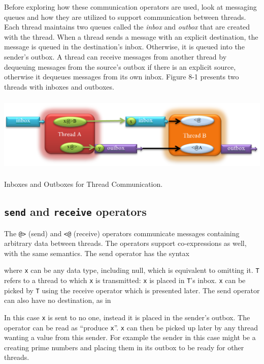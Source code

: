 Before exploring how these communication operators are used, look
at messaging queues and how they are utilized to support communication between
threads.  Each thread maintains two queues called the \emph{inbox} and
\emph{outbox} that are created with the thread.  When a thread sends a message
with an explicit destination, the message is queued in the destination's
inbox. Otherwise, it is queued into the sender's outbox.  A thread can receive
messages from another thread by dequeuing messages from the source's outbox if
there is an explicit source, otherwise it dequeues messages from its own inbox.
Figure 8-1 presents two threads with inboxes and outboxes.
\begin{center}
  \includegraphics[width=5.75in,height=1.45in]{ub-img/thread-fig1.png}
\end{center}
\vspace{-0.25cm}{\sffamily\bfseries Figure 8-1:}
{\sffamily Inboxes and Outboxes for Thread Communication.}


\subsection{\texttt{send} and \texttt{receive} operators}

The \texttt{@>} (send) and \texttt{{<}@} (receive) operators communicate
messages containing arbitrary data between threads. The operators support
co-expressions as well, with the same semantics. The send operator has the
syntax


\noindent
where \texttt{x} can be any data type, including null, which is equivalent to omitting
it. \texttt{T} refers to a thread to which \texttt{x} is transmitted: \texttt{x}
is placed in \texttt{T}'s inbox.  \texttt{x} can be picked by \texttt{T} using
the receive operator which is presented later. The send operator can also have
no destination, as in


In this case \texttt{x} is sent to no one, instead it is placed in the sender's
outbox. The operator can be read as ``produce \texttt{x}''.  \texttt{x} can then
be picked up later by any thread wanting a value from this sender.  For example
the sender in this case might be a creating prime numbers and placing them in
its outbox to be ready for other threads.

